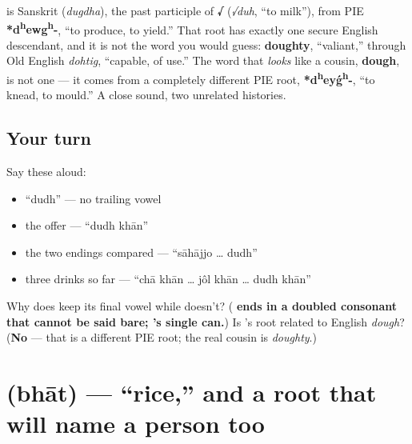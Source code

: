 \begin{cousinweb}
\textbf{} is Sanskrit \textbf{} (\emph{dugdha}), the past participle of \textbf{√} (\emph{√duh}, \textquotedblleft{}to milk\textquotedblright{}), from PIE \textbf{*d\textsuperscript{h}ewg\textsuperscript{h}-}, \textquotedblleft{}to produce, to yield.\textquotedblright{} That root has exactly one secure English descendant, and it is not the word you would guess: \textbf{doughty}, \textquotedblleft{}valiant,\textquotedblright{} through Old English \emph{dohtig}, \textquotedblleft{}capable, of use.\textquotedblright{} The word that \emph{looks} like a cousin, \textbf{dough}, is not one — it comes from a completely different PIE root, \textbf{*d\textsuperscript{h}eyǵ\textsuperscript{h}-}, \textquotedblleft{}to knead, to mould.\textquotedblright{} A close sound, two unrelated histories.
\end{cousinweb}

\subsection*{Your turn}
Say these aloud:

\begin{itemize}
\raggedright
  \item \textquotedblleft{}dudh\textquotedblright{} — no trailing vowel
  \item the offer — \textquotedblleft{}dudh khān\textquotedblright{}
  \item the two endings compared — \textquotedblleft{}sāhājjo … dudh\textquotedblright{}
  \item three drinks so far — \textquotedblleft{}chā khān … jôl khān … dudh khān\textquotedblright{}
\end{itemize}

\begin{tcolorbox}[breakable,colback=teal!4,colframe=teal!35!black,title={Before you move on}]
Why does  keep its final vowel while  doesn't? (\textbf{ ends in a doubled consonant that cannot be said bare; 's single  can.}) Is 's root related to English \emph{dough}? (\textbf{No} — that is a different PIE root; the real cousin is \emph{doughty}.)
\end{tcolorbox}
\section[bhāt]{ (bhāt) — \textquotedblleft{}rice,\textquotedblright{} and a root that will name a person too}


